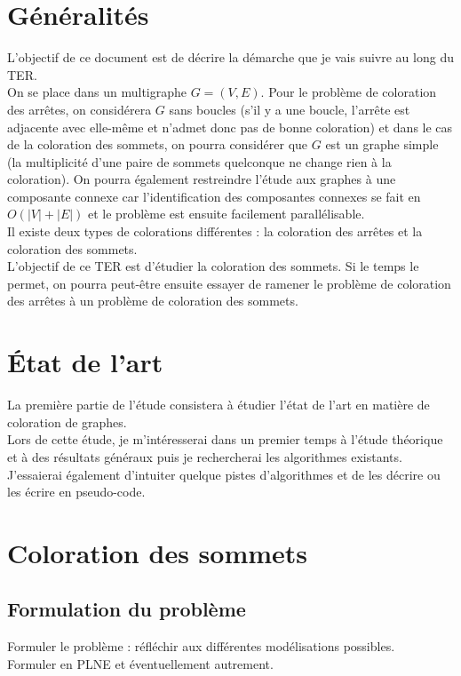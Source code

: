 \section{Généralités}
L'objectif de ce document est de décrire la démarche que
je vais suivre au long du TER.\\

On se place dans un multigraphe $G=(V,E)$. Pour le problème de coloration des
arrêtes, on considérera $G$ sans boucles (s'il y a une boucle, l'arrête est
adjacente avec elle-même et n'admet donc pas de bonne coloration) et dans le
cas de la coloration des sommets, on pourra considérer que $G$ est un graphe simple
(la multiplicité d'une paire de sommets quelconque ne change rien à la coloration).
On pourra également restreindre l'étude aux graphes à une composante connexe car
l'identification des composantes connexes se fait en $O(|V| + |E|)$ et le problème est
ensuite facilement parallélisable.\\

Il existe deux types de colorations différentes : la coloration des arrêtes et la
coloration des sommets.\\
L'objectif de ce TER est d'étudier la coloration des sommets. Si le temps le permet, on pourra peut-être ensuite essayer de ramener le problème de coloration des arrêtes à un problème de coloration des sommets.

\section{État de l'art}
La première partie de l'étude consistera à étudier l'état
de l'art en matière de coloration de graphes.\\
Lors de cette étude, je m'intéresserai dans un premier temps à
l'étude théorique et à des résultats généraux puis je rechercherai
les algorithmes existants.\\

J'essaierai également d'intuiter quelque
pistes d'algorithmes et de les décrire ou les écrire en pseudo-code.

\section{Coloration des sommets}

\subsection{Formulation du problème}
Formuler le problème : réfléchir aux différentes modélisations possibles.\\
Formuler en PLNE et éventuellement autrement.

